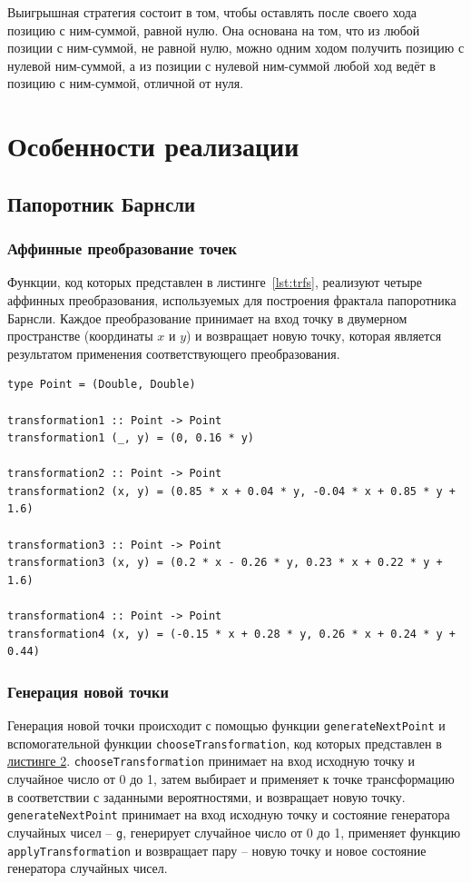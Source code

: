 \documentclass[11pt,a4paper,final]{article} %
\begin{document}
Выигрышная стратегия состоит в том, чтобы оставлять после своего хода позицию с ним-суммой, равной нулю. Она основана на том, что из любой позиции с ним-суммой, не равной нулю, можно одним ходом получить позицию с нулевой ним-суммой, а из позиции с нулевой ним-суммой любой ход ведёт в позицию с ним-суммой, отличной от нуля.

\newpage
\section{Особенности реализации}

\subsection{Папоротник Барнсли}

\subsubsection{Аффинные преобразование точек}

Функции, код которых представлен в листинге~\ref{lst:trfs}, реализуют четыре аффинных преобразования, используемых для построения фрактала папоротника Барнсли. Каждое преобразование принимает на вход точку в двумерном пространстве (координаты \( x \) и \( y \)) и возвращает новую точку, которая является результатом применения соответствующего преобразования.

\begin{lstlisting}[mathescape=true, caption={Аффинные преобразование точек}, label={lst:trfs}]
type Point = (Double, Double)
	
transformation1 :: Point -> Point
transformation1 (_, y) = (0, 0.16 * y)

transformation2 :: Point -> Point
transformation2 (x, y) = (0.85 * x + 0.04 * y, -0.04 * x + 0.85 * y + 1.6)

transformation3 :: Point -> Point
transformation3 (x, y) = (0.2 * x - 0.26 * y, 0.23 * x + 0.22 * y + 1.6)

transformation4 :: Point -> Point
transformation4 (x, y) = (-0.15 * x + 0.28 * y, 0.26 * x + 0.24 * y + 0.44)
\end{lstlisting}

\subsubsection{Генерация новой точки}

Генерация новой точки происходит с помощью функции \texttt{generateNextPoint} и вспомогательной функции \texttt{chooseTransformation}, код которых представлен в \hyperref[lst:genDot]{листинге 2}. \texttt{chooseTransformation} принимает на вход исходную точку и случайное число от 0 до 1, затем выбирает и применяет к точке трансформацию в соответствии с заданными вероятностями, и возвращает новую точку. \texttt{generateNextPoint} принимает на вход исходную точку и состояние генератора случайных чисел -- \texttt{g}, генерирует случайное число от 0 до 1, применяет функцию \texttt{applyTransformation} и возвращает пару -- новую точку и новое состояние генератора случайных чисел. 
\end{document}
